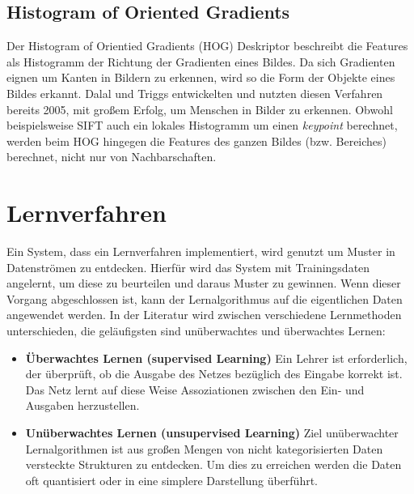 \subsection{Histogram of Oriented Gradients}

Der Histogram of Orientied Gradients (HOG) Deskriptor beschreibt die Features als Histogramm der Richtung der Gradienten eines Bildes. Da sich Gradienten eignen um Kanten in Bildern zu erkennen, wird so die Form der Objekte eines Bildes erkannt. Dalal und Triggs \cite{hog2005} entwickelten und nutzten diesen Verfahren bereits 2005, mit großem Erfolg, um Menschen in Bilder zu erkennen. Obwohl beispielsweise SIFT auch ein lokales Histogramm um einen \textit{keypoint} berechnet, werden beim HOG hingegen die Features des ganzen Bildes (bzw. Bereiches) berechnet, nicht nur von Nachbarschaften.

\section{Lernverfahren}

Ein System, dass ein Lernverfahren implementiert, wird genutzt um Muster in Datenströmen zu entdecken. Hierfür wird das System mit Trainingsdaten angelernt, um diese zu beurteilen und daraus Muster zu gewinnen. Wenn dieser Vorgang abgeschlossen ist, kann der Lernalgorithmus auf die eigentlichen Daten angewendet werden. In der Literatur wird zwischen verschiedene Lernmethoden unterschieden, die geläufigsten sind unüberwachtes und überwachtes Lernen:

\begin{itemize}
	\item \textbf{Überwachtes Lernen (supervised Learning)} Ein Lehrer ist erforderlich, der überprüft, ob die Ausgabe des Netzes bezüglich des Eingabe korrekt ist. Das Netz lernt auf diese Weise Assoziationen zwischen den Ein- und Ausgaben herzustellen.
	\item \textbf{Unüberwachtes Lernen (unsupervised Learning)} Ziel unüberwachter Lernalgorithmen ist aus großen Mengen von nicht kategorisierten Daten versteckte Strukturen zu entdecken. Um dies zu erreichen werden die Daten oft quantisiert oder in eine simplere Darstellung überführt.
\end{itemize}

